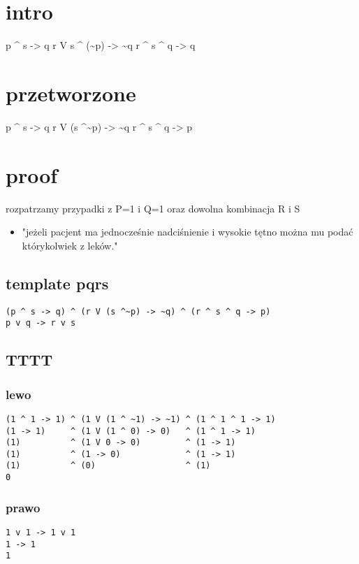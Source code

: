 \documentclass[11pt]{article}
\author{Patryk Kaniewski}
\date{\today}
\title{}
\begin{document}
\tableofcontents \clearpage\section{intro}
\label{sec:orgf81048c}
p \^{} s -> q
r V s \^{} (\textasciitilde{}p) -> \textasciitilde{}q
r \^{} s \^{} q -> q
\section{przetworzone}
\label{sec:org8246705}
p \^{} s -> q
r V (s \^{}\textasciitilde{}p) -> \textasciitilde{}q
r \^{} s \^{} q -> p


\section{proof}
\label{sec:orgb61df05}
rozpatrzamy przypadki z P=1 i Q=1 oraz dowolna kombinacja R i S

\begin{itemize}
\item "jeżeli pacjent ma jednocześnie nadciśnienie i wysokie tętno można mu podać którykolwiek z leków."
\end{itemize}
\subsection{template pqrs}
\label{sec:org5fefe0d}
\begin{verbatim}
(p ^ s -> q) ^ (r V (s ^~p) -> ~q) ^ (r ^ s ^ q -> p)
p v q -> r v s
\end{verbatim}
\subsection{TTTT}
\label{sec:org5816a15}
\subsubsection{lewo}
\label{sec:orgf12e3ae}
\begin{verbatim}
(1 ^ 1 -> 1) ^ (1 V (1 ^ ~1) -> ~1) ^ (1 ^ 1 ^ 1 -> 1)
(1 -> 1)     ^ (1 V (1 ^ 0) -> 0)   ^ (1 ^ 1 -> 1)
(1)          ^ (1 V 0 -> 0)         ^ (1 -> 1)
(1)          ^ (1 -> 0)             ^ (1 -> 1)
(1)          ^ (0)                  ^ (1)
0
\end{verbatim}
\subsubsection{prawo}
\label{sec:orgb6e0290}
\begin{verbatim}
1 v 1 -> 1 v 1
1 -> 1
1
\end{verbatim}
\end{document}
